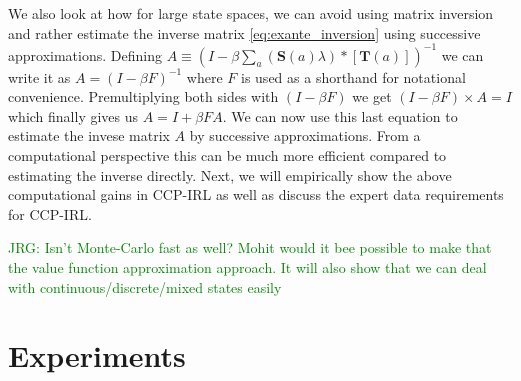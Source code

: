 \documentclass{article}
\begin{document}
We also look at how for large state spaces, we can avoid using matrix inversion and rather estimate the inverse matrix \eqref{eq:exante_inversion} using successive approximations.
Defining $A \equiv \left(I- \beta \sum_{a}(\mathbf{S}(a) \lambda) *\left[ \mathbf{T}(a)  \right]\right)^{-1}$ we can write it as $A = (I - \beta F)^{-1}$ where $F$ is used as a shorthand for notational convenience. Premultiplying both sides with $(I - \beta F)$ we get $(I - \beta F)\times A = I$ which finally gives us $A = I + \beta F A$. We can now use this last equation to estimate the invese matrix $A$ by successive approximations. From a computational perspective this can be much more efficient compared to estimating the inverse directly. Next, we will empirically show the above computational gains in CCP-IRL as well as discuss the expert data requirements for CCP-IRL.

\textcolor{green}{JRG: Isn't Monte-Carlo fast as well? Mohit would it bee possible to make that the value function approximation approach. It will also show that we can deal with continuous/discrete/mixed states easily }




\section{Experiments}
\end{document}
